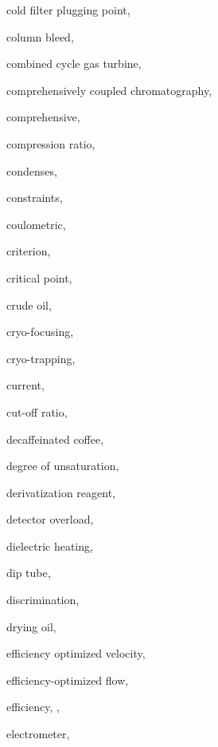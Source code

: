 \begin{theindex}
  \item \lowercase {cold filter plugging point}, 
  \item \lowercase {column bleed}, 
  \item \lowercase {combined cycle gas turbine}, 
  \item \lowercase {comprehensively coupled chromatography}, 
  \item \lowercase {comprehensive}, 
  \item \lowercase {compression ratio}, 
  \item \lowercase {condenses}, 
  \item \lowercase {constraints}, 
  \item \lowercase {coulometric}, 
  \item \lowercase {criterion}, 
  \item \lowercase {critical point}, 
  \item \lowercase {crude oil}, 
  \item \lowercase {cryo-focusing}, 
  \item \lowercase {cryo-trapping}, 
  \item \lowercase {current}, 
  \item \lowercase {cut-off ratio}, 
  \item \lowercase {decaffeinated coffee}, 
  \item \lowercase {degree of unsaturation}, 
  \item \lowercase {derivatization reagent}, 
  \item \lowercase {detector overload}, 
  \item \lowercase {dielectric heating}, 
  \item \lowercase {dip tube}, 
  \item \lowercase {discrimination}, 
  \item \lowercase {drying oil}, 
  \item \lowercase {efficiency optimized velocity}, 
  \item \lowercase {efficiency-optimized flow}, 
  \item \lowercase {efficiency}, , 
  \item \lowercase {electrometer}, 

\end{theindex}
